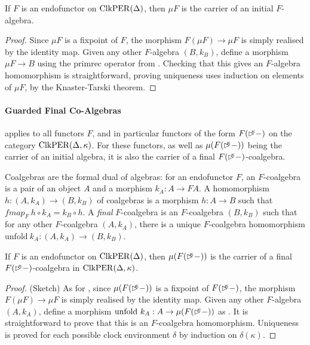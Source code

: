 \begin{theorem}\label{thm:initial-f-algebra}
  If $F$ is an endofunctor on $\mathrm{ClkPER}(\Delta)$, then $\mu F$ is the
  carrier of an initial $F$-algebra.
\end{theorem}

\begin{proof}
  Since $\mu F$ is a fixpoint of $F$, the morphism $F(\mu F) \to \mu
  F$ is simply realised by the identity map. Given any other
  $F$-algebra $(B,k_B)$, define a morphism $\mu F \to B$ using the
  $\mathrm{primrec}$ operator from
  . Checking that this gives an
  $F$-algebra homomorphism is straightforward, proving uniqueness uses
  induction on elements of $\mu F$, by the Knaster-Tarski theorem.
\end{proof}

\paragraph{Guarded Final Co-Algebras} 
applies to all functors $F$, and in particular functors of the form
$F(\mathord{\rhd\kern-0.4em^{\kappa}}-)$ on the category $\mathrm{ClkPER}(\Delta, \kappa)$. For
these functors, as well as $\mu (F(\mathord{\rhd\kern-0.4em^{\kappa}} -))$ being the carrier
of an initial algebra, it is also the carrier of a final
$F(\mathord{\rhd\kern-0.4em^{\kappa}}-)$-coalgebra.

Coalgebras are the formal dual of algebras: for an endofunctor $F$, an
$F$-coalgebra is a pair of an object $A$ and a morphism $k_A : A \to
FA$. A homomorphism $h : (A,k_A) \to (B,k_B)$ of coalgebras is a
morphism $h : A \to B$ such that $\mathit{fmap}_F~h \circ k_A =
k_B\circ h$. A \emph{final} $F$-coalgebra is an $F$-coalgebra
$(B,k_B)$ such that for any other $F$-coalgebra $(A,k_A)$, there is a
unique $F$-coalgebra homomorphism $\mathrm{unfold}~k_A : (A,k_A) \to
(B,k_B)$.

\begin{theorem}\label{thm:final-f-de-coalgebra}
  If $F$ is an endofunctor on $\mathrm{ClkPER}(\Delta)$, then $\mu
  (F(\mathord{\rhd\kern-0.4em^{\kappa}}-))$ is the carrier of a final
  $F(\mathord{\rhd\kern-0.4em^{\kappa}}-)$-coalgebra in $\mathrm{ClkPER}(\Delta,\kappa)$.
\end{theorem}

\begin{proof} (Sketch) As for , since
  $\mu (F(\mathord{\rhd\kern-0.4em^{\kappa}}-))$ is a fixpoint of $F(\mathord{\rhd\kern-0.4em^{\kappa}}-)$, the
  morphism $F(\mu F) \to \mu F$ is simply realised by the identity
  map. Given any other $F$-algebra $(A,k_A)$, define a morphism
  $\mathrm{unfold}~k_A : A \to \mu(F(\mathord{\rhd\kern-0.4em^{\kappa}}-))$ as
  . It is straightforward to prove that this is an
  $F$-coalgebra homomorphism. Uniqueness is proved for each possible
  clock environment $\delta$ by induction on $\delta(\kappa)$.
\end{proof}

